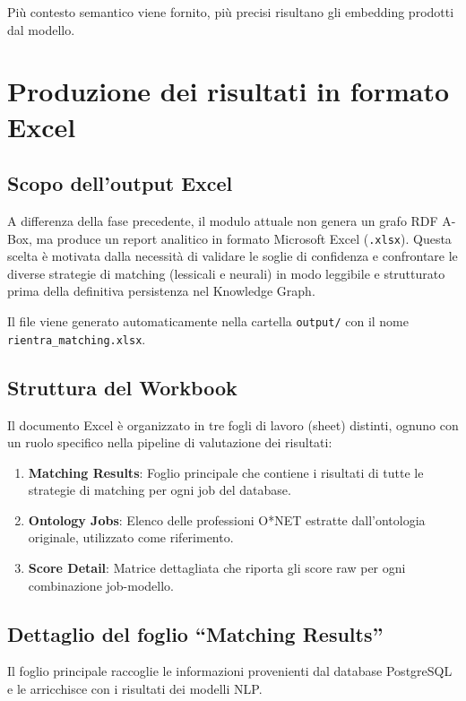 \documentclass[12pt, a4paper]{report}
\begin{document}
Più contesto semantico viene fornito, più precisi risultano gli
embedding prodotti dal modello.


% 
\chapter{Produzione dei risultati in formato Excel}
% 

\section{Scopo dell'output Excel}

A differenza della fase precedente, il modulo attuale non genera un grafo RDF A-Box, ma produce un report analitico in formato Microsoft Excel (\texttt{.xlsx}). Questa scelta è motivata dalla necessità di validare le soglie di confidenza e confrontare le diverse strategie di matching (lessicali e neurali) in modo leggibile e strutturato prima della definitiva persistenza nel Knowledge Graph.

Il file viene generato automaticamente nella cartella \texttt{output/} con il nome\\ \texttt{rientra\_matching.xlsx}.

\section{Struttura del Workbook}

Il documento Excel è organizzato in tre fogli di lavoro (sheet) distinti, ognuno con un ruolo specifico nella pipeline di valutazione dei risultati:

\begin{enumerate}
  \item \textbf{Matching Results}: Foglio principale che contiene i risultati di tutte le strategie di matching per ogni job del database.
  \item \textbf{Ontology Jobs}: Elenco delle professioni O*NET estratte dall'ontologia originale, utilizzato come riferimento.
  \item \textbf{Score Detail}: Matrice dettagliata che riporta gli score raw per ogni combinazione job-modello.
\end{enumerate}

\section{Dettaglio del foglio ``Matching Results''}

Il foglio principale raccoglie le informazioni provenienti dal database PostgreSQL e le arricchisce con i risultati dei modelli NLP.
\end{document}
